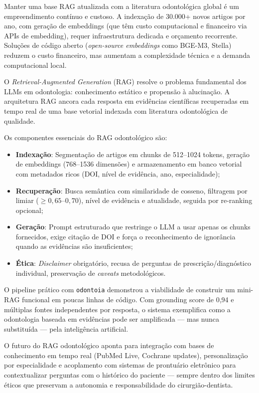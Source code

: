Manter uma base RAG atualizada com a literatura odontológica global é um empreendimento contínuo e custoso. A indexação de 30.000+ novos artigos por ano, com geração de embeddings (que têm custo computacional e financeiro via APIs de embedding), requer infraestrutura dedicada e orçamento recorrente. Soluções de código aberto (\textit{open-source embeddings} como BGE-M3, Stella) reduzem o custo financeiro, mas aumentam a complexidade técnica e a demanda computacional local.

O \textit{Retrieval-Augmented Generation} (RAG) resolve o problema fundamental dos LLMs em odontologia: conhecimento estático e propensão à alucinação. A arquitetura RAG ancora cada resposta em evidências científicas recuperadas em tempo real de uma base vetorial indexada com literatura odontológica de qualidade.

Os componentes essenciais do RAG odontológico são:
\begin{itemize}
    \item \textbf{Indexação}: Segmentação de artigos em chunks de 512--1024 tokens, geração de embeddings (768--1536 dimensões) e armazenamento em banco vetorial com metadados ricos (DOI, nível de evidência, ano, especialidade);
    \item \textbf{Recuperação}: Busca semântica com similaridade de cosseno, filtragem por limiar ($\ge 0,65$--$0,70$), nível de evidência e atualidade, seguida por re-ranking opcional;
    \item \textbf{Geração}: Prompt estruturado que restringe o LLM a usar apenas os chunks fornecidos, exige citação de DOI e força o reconhecimento de ignorância quando as evidências são insuficientes;
    \item \textbf{Ética}: \textit{Disclaimer} obrigatório, recusa de perguntas de prescrição/diagnóstico individual, preservação de \textit{caveats} metodológicos.
\end{itemize}

O pipeline prático com \texttt{odontoia} demonstrou a viabilidade de construir um mini-RAG funcional em poucas linhas de código. Com grounding score de 0,94 e múltiplas fontes independentes por resposta, o sistema exemplifica como a odontologia baseada em evidências pode ser amplificada --- mas nunca substituída --- pela inteligência artificial.

O futuro do RAG odontológico aponta para integração com bases de conhecimento em tempo real (PubMed Live, Cochrane updates), personalização por especialidade e acoplamento com sistemas de prontuário eletrônico para contextualizar perguntas com o histórico do paciente --- sempre dentro dos limites éticos que preservam a autonomia e responsabilidade do cirurgião-dentista.

